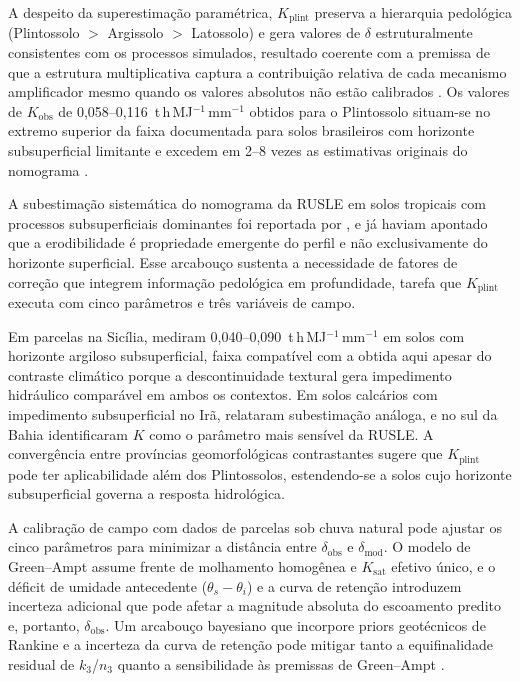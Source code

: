 \documentclass[preprint,review,12pt,authoryear]{elsarticle}
\begin{document}
A despeito da superestimação paramétrica, $K_{\mathrm{plint}}$ preserva a hierarquia pedológica (Plintossolo $>$ Argissolo $>$ Latossolo) e gera valores de $\delta$ estruturalmente consistentes com os processos simulados, resultado coerente com a premissa de que a estrutura multiplicativa captura a contribuição relativa de cada mecanismo amplificador mesmo quando os valores absolutos não estão calibrados \citep{renard_et_al_1997}. Os valores de $K_{\mathrm{obs}}$ de 0,058--0,116~t\,h\,MJ$^{-1}$\,mm$^{-1}$ obtidos para o Plintossolo situam-se no extremo superior da faixa documentada para solos brasileiros com horizonte subsuperficial limitante \citep{lafayette_cantalice_coutinho_2011,cassol_et_al_2023} e excedem em 2--8 vezes as estimativas originais do nomograma \citep{wischmeier_et_al_1971}.

A subestimação sistemática do nomograma da RUSLE em solos tropicais com processos subsuperficiais dominantes foi reportada por \citet{alewell_et_al_2019}, e \citet{torri_poesen_2014} já haviam apontado que a erodibilidade é propriedade emergente do perfil e não exclusivamente do horizonte superficial. Esse arcabouço sustenta a necessidade de fatores de correção que integrem informação pedológica em profundidade, tarefa que $K_{\mathrm{plint}}$ executa com cinco parâmetros e três variáveis de campo.

Em parcelas na Sicília, \citet{bagarello_et_al_2012} mediram 0,040--0,090~t\,h\,MJ$^{-1}$\,mm$^{-1}$ em solos com horizonte argiloso subsuperficial, faixa compatível com a obtida aqui apesar do contraste climático porque a descontinuidade textural gera impedimento hidráulico comparável em ambos os contextos. Em solos calcários com impedimento subsuperficial no Irã, \citet{ostovari_et_al_2016} relataram subestimação análoga, e no sul da Bahia \citet{francois_et_al_2024} identificaram $K$ como o parâmetro mais sensível da RUSLE. A convergência entre províncias geomorfológicas contrastantes sugere que $K_{\mathrm{plint}}$ pode ter aplicabilidade além dos Plintossolos, estendendo-se a solos cujo horizonte subsuperficial governa a resposta hidrológica.

A calibração de campo com dados de parcelas sob chuva natural pode ajustar os cinco parâmetros para minimizar a distância entre $\delta_{\mathrm{obs}}$ e $\delta_{\mathrm{mod}}$. O modelo de Green--Ampt assume frente de molhamento homogênea e $K_{\mathrm{sat}}$ efetivo único, e o déficit de umidade antecedente ($\theta_s - \theta_i$) e a curva de retenção introduzem incerteza adicional que pode afetar a magnitude absoluta do escoamento predito e, portanto, $\delta_{\mathrm{obs}}$. Um arcabouço bayesiano que incorpore priors geotécnicos de Rankine e a incerteza da curva de retenção pode mitigar tanto a equifinalidade residual de $k_3$/$n_3$ quanto a sensibilidade às premissas de Green--Ampt \citep{beven_freer_2001}.
\end{document}
